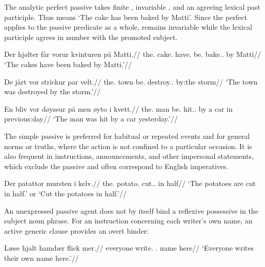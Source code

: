 The analytic perfect passive takes finite , invariable , and an agreeing lexical past participle. Thus  means `The cake has been baked by Matti'. Since the perfect applies to the passive predicate as a whole,  remains invariable while the lexical participle agrees in number with the promoted subject.

\pex
\begingl
\gla Der hjølter får vorur kvinturen på Matti.//
\glb the.\Pl{} cake.\Pl{} have.\Pres{} be.\PstP{} bake.\PstP{}.\Pl{} by Matti//
\glft `The cakes have been baked by Matti.'//
\endgl
\xe

\pex
\begingl
\gla De jårt vor strickur par velt.//
\glb the.\F{} town be.\Pst{} destroy.\PstP{}.\Sg{} by:the storm//
\glft `The town was destroyed by the storm.'//
\endgl
\xe

\pex
\begingl
\gla En bliv vor døyssur på men øyto i kvett.//
\glb the.\M{} man be.\Pst{} hit.\PstP{}.\Sg{} by a car in previous:day//
\glft `The man was hit by a car yesterday.'//
\endgl
\xe

\Needspace{240bp}
The simple passive is preferred for habitual or repeated events and for general norms or truths, where the action is not confined to a particular occasion. It is also frequent in instructions, announcements, and other impersonal statements, which exclude the  passive and often correspond to English imperatives.


\pex
\begingl
\gla Der patattor mursten i kelv.//
\glb the.\Pl{} potato.\Pl{} cut.\Pres{}.\Pass{} in half//
\glft `The potatoes are cut in half.' or `Cut the potatoes in half.'//
\endgl
\xe

An unexpressed passive agent does not by itself bind a reflexive possessive in the subject noun phrase. For an instruction concerning each writer's own name, an active generic clause provides an overt binder:

\pex
\begingl
\gla Læse hjalt hamdær flick mer.//
\glb everyone write.\Pres{} \Refl{}.\F{} name here//
\glft `Everyone writes their own name here.'//
\endgl
\xe
